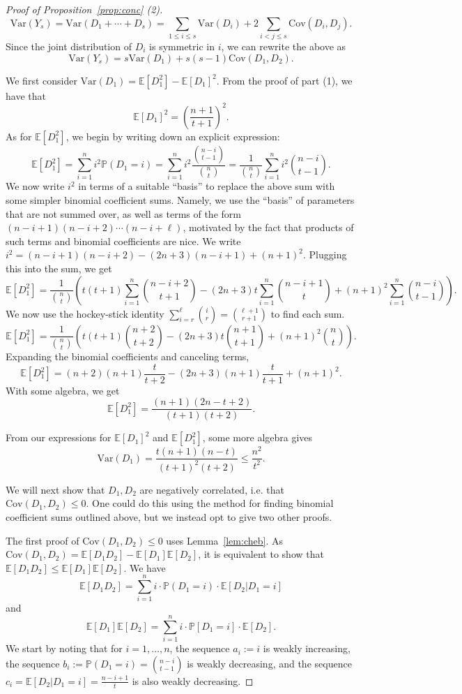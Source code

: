 \documentclass{amsart}
\theoremstyle{definition}
\newcommand{\Var}{\mathrm{Var}}
\newcommand{\Cov}{\mathrm{Cov}}
\begin{document}
\begin{proof}[Proof of Proposition~\ref{prop:conc} (2)]
\[\Var(Y_s)=\Var(D_1+\cdots+D_s)=\sum_{1\leq i\leq s}\Var(D_i)+2\sum_{i<j\leq s}\Cov(D_i,D_j).\]
Since the joint distribution of $D_i$ is symmetric in $i$, we can rewrite the above as
\[\Var(Y_s)=s\Var(D_1)+s(s-1)\Cov(D_1,D_2).\]

We first consider $\Var(D_1)=\mathbb{E}[D_1^2]-\mathbb{E}[D_1]^2.$ From the proof of part (1), we have that 
\[\mathbb{E}[D_1]^2=\left(\frac{n+1}{t+1}\right)^2.\]
As for $\mathbb{E}[D_1^2]$, we begin by writing down an explicit expression:
\[\mathbb{E}[D_1^2]=\sum_{i=1}^{n}i^2\mathbb{P}(D_1=i)=\sum_{i=1}^n i^2 \frac{\binom{n-i}{t-1}}{\binom{n}{t}}=\frac{1}{\binom{n}{t}}\sum_{i=1}^n i^2\binom{n-i}{t-1}.\]
We now write $i^2$ in terms of a suitable ``basis'' to replace the above sum with some simpler binomial coefficient sums. Namely, we use the ``basis'' of parameters that are not summed over, as well as terms of the form $(n-i+1)(n-i+2)\cdots (n-i+\ell)$, motivated by the fact that products of such terms and binomial coefficients are nice. We write $i^2=(n-i+1)(n-i+2)-(2n+3)(n-i+1)+(n+1)^2$. Plugging this into the sum, we get
\[\mathbb{E}[D_1^2]=\frac{1}{\binom{n}{t}}\left(t(t+1)\sum_{i=1}^n \binom{n-i+2}{t+1}-(2n+3)t\sum_{i=1}^n\binom{n-i+1}{t}+(n+1)^2\sum_{i=1}^n\binom{n-i}{t-1}\right).\]
We now use the hockey-stick identity $\sum_{i=r}^\ell \binom{i}{r}=\binom{\ell+1}{r+1}$ to find each sum.
\[\mathbb{E}[D_1^2]=\frac{1}{\binom{n}{t}}\left(t(t+1)\binom{n+2}{t+2}-(2n+3)t\binom{n+1}{t+1}+(n+1)^2\binom{n}{t}\right).\]
Expanding the binomial coefficients and canceling terms,
\[\mathbb{E}[D_1^2]=(n+2)(n+1)\frac{t}{t+2}-(2n+3)(n+1)\frac{t}{t+1}+(n+1)^2.\]
With some algebra, we get
\[\mathbb{E}[D_1^2]=\frac{(n+1)(2n-t+2)}{(t+1)(t+2)}.\]

From our expressions for $\mathbb{E}[D_1]^2$ and $\mathbb{E}[D_1^2]$, some more algebra gives 
\[\Var(D_1)=\frac{t(n+1)(n-t)}{(t+1)^2(t+2)}\leq \frac{n^2}{t^2}.\]

We will next show that $D_1,D_2$ are negatively correlated, i.e. that $\Cov(D_1,D_2)\leq 0$. One could do this using the method for finding binomial coefficient sums outlined above, but we instead opt to give two other proofs.

The first proof of $\Cov(D_1,D_2)\leq 0$ uses Lemma~\ref{lem:cheb}. As $\Cov(D_1,D_2)=\mathbb{E}[D_1 D_2]-\mathbb{E}[D_1]\mathbb{E}[D_2]$, it is equivalent to show that $\mathbb{E}[D_1 D_2]\leq \mathbb{E}[D_1]\mathbb{E}[D_2]$. We have
\[\mathbb{E}[D_1 D_2]=\sum_{i=1}^n i\cdot \mathbb{P}(D_1=i)\cdot \mathbb{E}[D_2|D_1=i]\]
and
\[\mathbb{E}[D_1]\mathbb{E}[D_2]=\sum_{i=1}^n i \cdot \mathbb{P}[D_1=i]\cdot \mathbb{E}[D_2].\]
We start by noting that for $i=1,\ldots,n$, the sequence $a_i:=i$ is weakly increasing, the sequence $b_i:=\mathbb{P}(D_1=i)=\binom{n-i}{t-1}$ is weakly decreasing, and the sequence $c_i=\mathbb{E}[D_2|D_1=i]=\frac{n-i+1}{t}$ is also weakly decreasing.


\end{proof}
\end{document}
